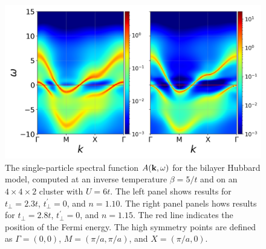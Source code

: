 \documentclass[prb,twocolumn,amsmath,amssymb,superscriptaddress,floatfix,nofootinbib]{revtex4-2}
\begin{document}
\begin{figure}[t]
\centering
\includegraphics[scale=0.34]{commonAKW_U6_n0pt9_vs_n0pt85_tp2pt3_vs_tp2pt8_bt5.png}
\caption{The single-particle spectral function $A({\bf k},\omega)$ for the bilayer Hubbard model, computed at an inverse temperature $\beta = 5/t$ and on an $4\times4\times2$ cluster with $U = 6t$. The left panel shows results for $t_{\perp} = 2.3t$, $t_\perp^\prime = 0$, and $n =1.10$. The right panel panels hows results for $t_{\perp} = 2.8t$, $t_\perp^\prime = 0$, and $n =1.15$. The red line indicates the position of the Fermi energy. The high symmetry points are defined as $\Gamma = (0,0)$, $M = (\pi/a,\pi/a)$, and $X = (\pi/a,0)$.}
\label{fig:Akwbulkinc}
\end{figure}
\end{document}
